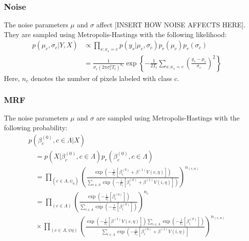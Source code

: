 \documentclass[11pt]{article}
\begin{document}
\subsubsection{Noise}
The noise parameters $\mu$ and $\sigma$ affect [INSERT HOW NOISE AFFECTS HERE].
They are sampled using Metropolis-Hastings with the following likelihood:
\begin{equation}
\begin{aligned}
p\left(\mu_{c}, \sigma_{c} | Y, X\right) & \propto \prod_{s: x_{s}=c} p\left(y_{s} | \mu_{c}, \sigma_{c}\right) p_{r}\left(\mu_{c}\right) p_{r}\left(\sigma_{c}\right) \\
&=\frac{1}{\sigma_{c}\left(2 \pi \sigma_{c}^{2} T_{t}\right)^{n_{c}}} \exp \left\{-\frac{1}{2 T_{t}} \sum_{s: x_s = c}\left(\frac{y_{s}-\mu_{c}}{\sigma_{c}}\right)^{2}\right\}
\end{aligned}
\end{equation}
Here, $n_c$ denotes the number of pixels labeled with class $c$. 

\subsubsection{MRF}
The noise parameters $\mu$ and $\sigma$ are sampled using Metropolis-Hastings with the following probability:
\begin{equation}
\begin{array}{l}
p\left(\beta_{c}^{(0)}, c \in \Lambda | X\right) \\
\quad=p\left(X | \beta_{c}^{(0)}, c \in \Lambda\right) p_{r}\left(\beta_{c}^{(0)}, c \in \Lambda\right) \\
\quad=\prod_{\left(c \in \Lambda, \psi_{\eta}\right)}\left(\frac{\exp \left(-\frac{1}{T_{t}}\left[\beta_{c}^{(0)}+\beta^{(1)} V(c, \eta)\right]\right)}{\sum_{i \in \Lambda} \exp \left(-\frac{1}{T_{t}}\left[\beta_{i}^{(0)}+\beta^{(1)} V(i, \eta)\right]\right)}\right)^{n_{(c, n)}} \\
\quad=\prod_{(c \in \Lambda)}\left(\frac{\exp \left(-\frac{1}{T_{t}}\left[\beta_{c}^{(0)}\right]\right)}{\sum_{i \in \Lambda} \exp \left(-\frac{1}{T_{t}}\left[\beta_{i}^{(0)}\right]\right)}\right)^{n_{c}} \\
\quad \times \prod_{(c \in \Lambda, \psi \eta)}\left(\frac{\exp \left(-\frac{1}{T_{t}}\left[\beta^{(1)} V(c, \eta)\right]\right) \sum_{i \in \Lambda} \exp \left(-\frac{1}{T_{t}}\left[\beta_{i}^{(0)}\right]\right)}{\sum_{i \in \Lambda} \exp \left(-\frac{1}{T_{t}}\left[\beta_{i}^{(0)}+\beta^{(1)} V(i, \eta)\right]\right.}\right)^{n_{(c, n)}}
\end{array}
\end{equation}
\end{document}
